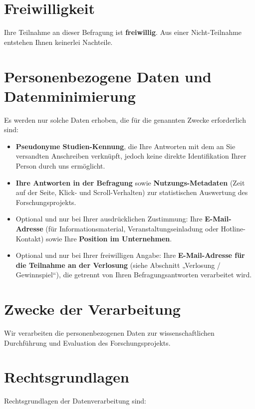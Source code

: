 \documentclass[11pt,a4paper,parskip=half,DIV=12]{scrartcl}
\begin{document}
\section*{Freiwilligkeit}

Ihre Teilnahme an dieser Befragung ist \textbf{freiwillig}. Aus einer Nicht-Teilnahme entstehen Ihnen keinerlei Nachteile.

\section*{Personenbezogene Daten und Datenminimierung}

Es werden nur solche Daten erhoben, die für die genannten Zwecke erforderlich sind:

\begin{itemize}
  \item \textbf{Pseudonyme Studien-Kennung}, die Ihre Antworten mit dem an Sie versandten Anschreiben verknüpft, jedoch keine direkte Identifikation Ihrer Person durch uns ermöglicht.
  \item \textbf{Ihre Antworten in der Befragung} sowie \textbf{Nutzungs-Metadaten} (Zeit auf der Seite, Klick- und Scroll-Verhalten) zur statistischen Auswertung des Forschungs\-projekts.
  \item Optional und nur bei Ihrer ausdrücklichen Zustimmung: Ihre \textbf{E-Mail-Adresse} (für Informations\-material, Veranstaltungs\-einladung oder Hotline-Kontakt) sowie Ihre \textbf{Position im Unternehmen}.
  \item Optional und nur bei Ihrer freiwilligen Angabe: Ihre \textbf{E-Mail-Adresse für die Teilnahme an der Verlosung} (siehe Abschnitt „Verlosung / Gewinnspiel“), die getrennt von Ihren Befragungs\-antworten verarbeitet wird.
\end{itemize}

\section*{Zwecke der Verarbeitung}

Wir verarbeiten die personenbezogenen Daten zur wissenschaftlichen Durchführung und Evaluation des Forschungsprojekts.

\section*{Rechtsgrundlagen}

Rechtsgrundlagen der Datenverarbeitung sind:
\end{document}
